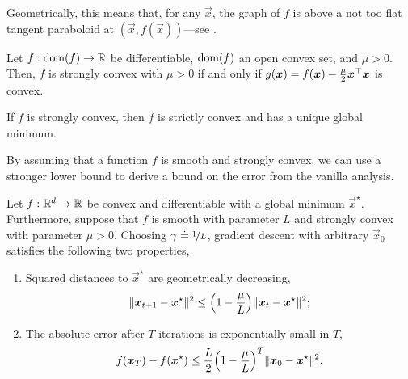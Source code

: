 Geometrically, this means that, for any $\vec{x}$, the graph of $f$ is above a not too flat tangent
paraboloid at $(\vec{x},f(\vec{x}))$---see .

\begin{lemma}
    Let $f: \mathrm{dom}(f) \to \mathbb{R}$ be differentiable, $\mathrm{dom}(f)$ an open convex set, and $\mu > 0$. Then, $f$
    is strongly convex with $\mu > 0$ if and only if $g(\bm{x}) = f(\bm{x}) - \frac{\mu}{2}
        \bm{x}^\top \bm{x}$ is convex.
\end{lemma}

\begin{lemma}
    If $f$ is strongly convex, then $f$ is strictly convex and has a unique global minimum.
\end{lemma}

By assuming that a function $f$ is smooth and strongly convex, we can use a stronger lower bound to
derive a bound on the error from the vanilla analysis.

\begin{theorem}
    Let $f: \mathbb{R}^d \to \mathbb{R}$ be convex and differentiable with a global minimum $\vec{x}^\star$.
    Furthermore, suppose that $f$ is smooth with parameter $L$ and strongly convex with parameter
    $\mu > 0$. Choosing $\gamma \doteq \nicefrac{1}{L}$, gradient descent with arbitrary $\vec{x}_0$
    satisfies the following two properties,
    \begin{enumerate}
        \item Squared distances to $\vec{x}^\star$ are geometrically decreasing, \[
                  \|\vec{x}_{t+1} - \vec{x}^\star\|^2 \leq \lft( 1-\frac{\mu}{L} \rgt) \|\vec{x}_t-\vec{x}^\star\|^2;
              \]
        \item The absolute error after $T$ iterations is exponentially small in $T$, \[
                  f(\vec{x}_T) - f(\vec{x}^\star) \leq \frac{L}{2} \lft( 1-\frac{\mu}{L} \rgt)^T \|\vec{x}_0 - \vec{x}^\star\|^2.
              \]
    \end{enumerate}
\end{theorem}

